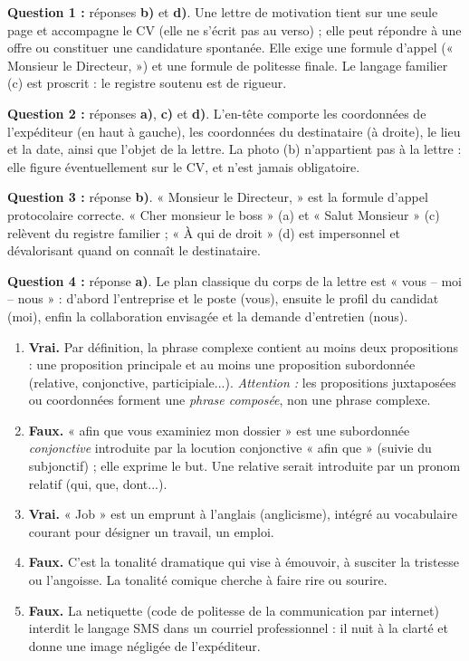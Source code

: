 \documentclass[11pt]{article}
\newcommand{\cle}[1]{{\popxbold\color{popdark}#1}}
\begin{document}
\begin{corrige}
\textbf{Question 1 :} réponses \textbf{b)} et \textbf{d)}. Une lettre de motivation tient sur une seule page et accompagne le CV (elle ne s'écrit pas au verso) ; elle peut répondre à une offre ou constituer une candidature spontanée. Elle exige une \cle{formule d'appel} (« Monsieur le Directeur, ») et une \cle{formule de politesse} finale. Le langage familier (c) est proscrit : le registre soutenu est de rigueur.

\textbf{Question 2 :} réponses \textbf{a)}, \textbf{c)} et \textbf{d)}. L'\cle{en-tête} comporte les coordonnées de l'expéditeur (en haut à gauche), les coordonnées du destinataire (à droite), le lieu et la date, ainsi que l'\cle{objet} de la lettre. La photo (b) n'appartient pas à la lettre : elle figure éventuellement sur le CV, et n'est jamais obligatoire.

\textbf{Question 3 :} réponse \textbf{b)}. « Monsieur le Directeur, » est la formule d'appel protocolaire correcte. « Cher monsieur le boss » (a) et « Salut Monsieur » (c) relèvent du registre familier ; « À qui de droit » (d) est impersonnel et dévalorisant quand on connaît le destinataire.

\textbf{Question 4 :} réponse \textbf{a)}. Le plan classique du corps de la lettre est « \cle{vous} – \cle{moi} – \cle{nous} » : d'abord l'entreprise et le poste (vous), ensuite le profil du candidat (moi), enfin la collaboration envisagée et la demande d'entretien (nous).
\end{corrige}

\begin{corrige}
\begin{enumerate}
\item \textbf{Vrai.} Par définition, la \cle{phrase complexe} contient au moins deux propositions : une proposition principale et au moins une proposition subordonnée (relative, conjonctive, participiale...). \emph{Attention :} les propositions juxtaposées ou coordonnées forment une \emph{phrase composée}, non une phrase complexe.
\item \textbf{Faux.} « afin que vous examiniez mon dossier » est une subordonnée \emph{conjonctive} introduite par la locution conjonctive « afin que » (suivie du subjonctif) ; elle exprime le but. Une relative serait introduite par un pronom relatif (qui, que, dont...).
\item \textbf{Vrai.} « Job » est un \cle{emprunt} à l'anglais (anglicisme), intégré au vocabulaire courant pour désigner un travail, un emploi.
\item \textbf{Faux.} C'est la \cle{tonalité dramatique} qui vise à émouvoir, à susciter la tristesse ou l'angoisse. La tonalité comique cherche à faire rire ou sourire.
\item \textbf{Faux.} La \cle{netiquette} (code de politesse de la communication par internet) interdit le langage SMS dans un courriel professionnel : il nuit à la clarté et donne une image négligée de l'expéditeur.
\end{enumerate}
\end{corrige}
\end{document}
